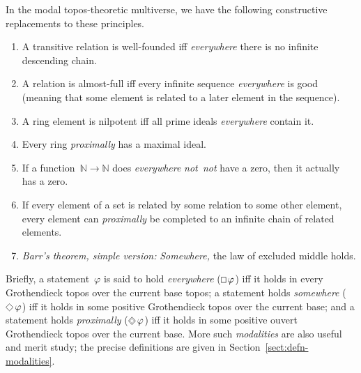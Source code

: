 \documentclass[oneside,reqno]{amsart}
\theoremstyle{definition}
\theoremstyle{plain}
\theoremstyle{remark}
\newcommand{\NN}{\mathbb{N}}
\renewcommand{\_}{\mathpunct{.}\,}
\newcommand{\notnot}{\emph{not~not}\xspace}
\DeclareMathOperator{\possible}{\text{\tikz[scale=.6ex/1cm,baseline=-.6ex,rotate=45,line width=.1ex]{\draw (-1,-1) rectangle (1,1);}}}
\DeclareMathOperator{\necessary}{\text{\tikz[scale=.6ex/1cm,baseline=-.6ex,line width=.1ex]{\draw (-1,-1) rectangle (1,1);}}}
\DeclareMathOperator{\xpossible}{\text{\tikz[scale=.6ex/1cm,baseline=-.6ex,rotate=45,line width=.1ex]{\draw (-1,-1) rectangle (1,1); \draw[very thin] (-.6,-.6) rectangle (.6,.6);}}}
\newcommand{\?}{\,{:}\,}
\begin{document}
In the modal topos-theoretic multiverse, we have the following constructive
replacements to these principles.
\begin{enumerate}
\item A transitive relation is well-founded iff \emph{everywhere} there is no infinite descending
chain.
\item A relation is almost-full iff every infinite sequence \emph{everywhere} is good (meaning
that some element is related to a later element in the sequence).
\item A ring element is nilpotent iff all prime
ideals \emph{everywhere} contain it.
\item Every ring \emph{proximally} has a maximal ideal.
\item If a function~$\NN \to \NN$ does \emph{everywhere} \notnot have
a zero, then it actually has a zero.
\item If every element of a set is related by some relation to some other
element, every element can \emph{proximally} be completed to an infinite chain
of related elements.
\item \emph{Barr's theorem, simple version:} \emph{Somewhere,} the law of
excluded middle holds.
\end{enumerate}

Briefly, a statement~$\varphi$ is said to hold \emph{everywhere}
($\necessary\varphi$) iff it holds in every Grothendieck topos over the
current base topos; a statement holds \emph{somewhere} ($\possible\varphi$)
iff it holds in some positive Grothendieck topos over the current base; and a
statement holds \emph{proximally} ($\xpossible\varphi$) iff it holds in
some positive ouvert Grothendieck topos over the current base. More such
\emph{modalities} are also useful and merit study; the precise definitions are
given in Section~\ref{sect:defn-modalities}.
\end{document}
